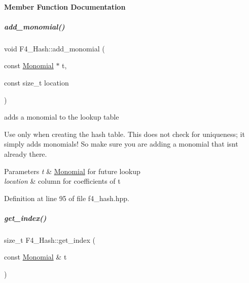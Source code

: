 \paragraph{Member Function Documentation}
\mbox{\label{group___g_b_computation_a86a18244162325e3d792ea39525b23f8}} 
\subparagraph{\texorpdfstring{add\+\_\+monomial()}{add\_monomial()}}
{\footnotesize\ttfamily void F4\+\_\+\+Hash\+::add\+\_\+monomial (\begin{DoxyParamCaption}\item[{const \hyperlink{group__polygroup_class_monomial}{Monomial} $\ast$}]{t,  }\item[{const size\+\_\+t}]{location }\end{DoxyParamCaption})\hspace{0.3cm}{\ttfamily [inline]}}



adds a monomial to the lookup table 

Use only when creating the hash table. This does not check for uniqueness; it simply adds monomials! So make sure you are adding a monomial that isn\textquotesingle{}t already there. 
\begin{DoxyParams}{Parameters}
{\em t} & {\ttfamily \hyperlink{group__polygroup_class_monomial}{Monomial}} for future lookup \\
\hline
{\em location} & column for coefficients of {\ttfamily t} \\
\hline
\end{DoxyParams}


Definition at line 95 of file f4\+\_\+hash.\+hpp.

\mbox{\label{group___g_b_computation_a7b22f6999f276e58087fe668a01f240a}} 
\subparagraph{\texorpdfstring{get\+\_\+index()}{get\_index()}\hspace{0.1cm}{\footnotesize\ttfamily [1/2]}}
{\footnotesize\ttfamily size\+\_\+t F4\+\_\+\+Hash\+::get\+\_\+index (\begin{DoxyParamCaption}\item[{const \hyperlink{group__polygroup_class_monomial}{Monomial} \&}]{t }\end{DoxyParamCaption})\hspace{0.3cm}{\ttfamily [inline]}}



